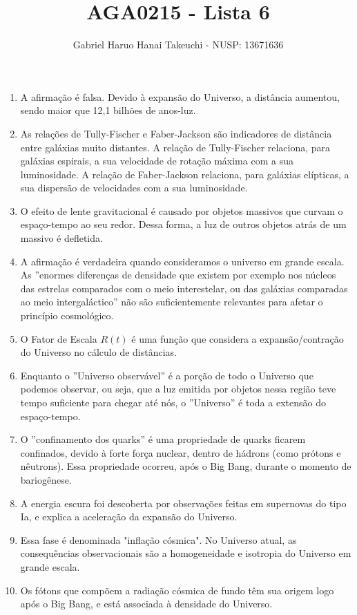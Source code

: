 \documentclass{article}
\author{Gabriel Haruo Hanai Takeuchi - NUSP: 13671636}
\title{AGA0215 - Lista 6}
\date{}
\begin{document}
\maketitle

\begin{enumerate}
  \item A afirmação é falsa. Devido à expansão do Universo, a distância aumentou, sendo maior que 12,1 bilhões de anos-luz.
  \item As relações de Tully-Fischer e Faber-Jackson são indicadores de distância entre galáxias muito distantes. A relação de Tully-Fischer relaciona, para galáxias espirais, a sua velocidade de rotação máxima com a sua luminosidade. A relação de Faber-Jackson relaciona, para galáxias elípticas, a sua dispersão de velocidades com a sua luminosidade.
  \item O efeito de lente gravitacional é causado por objetos massivos que curvam o espaço-tempo ao seu redor. Dessa forma, a luz de outros objetos atrás de um massivo é defletida.
  \item A afirmação é verdadeira quando consideramos o universo em grande escala. As ''enormes diferenças de densidade que existem por exemplo nos núcleos das estrelas comparados com o meio interestelar, ou das galáxias comparadas ao meio intergaláctico'' não são suficientemente relevantes para afetar o princípio cosmológico.
  \item O Fator de Escala $R(t)$ é uma função que considera a expansão/contração do Universo no cálculo de distâncias.
  \item Enquanto o ''Universo observável'' é a porção de todo o Universo que podemos observar, ou seja, que a luz emitida por objetos nessa região teve tempo suficiente para chegar até nós, o ''Universo'' é toda a extensão do espaço-tempo.
  \item O ''confinamento dos quarks'' é uma propriedade de quarks ficarem confinados, devido à forte força nuclear, dentro de hádrons (como prótons e nêutrons). Essa propriedade ocorreu, após o Big Bang, durante o momento de bariogênese.
  \item A energia escura foi descoberta por observações feitas em supernovas do tipo Ia, e explica a aceleração da expansão do Universo.
  \item Essa fase é denominada "inflação cósmica". No Universo atual, as consequências observacionais são a homogeneidade e isotropia do Universo em grande escala.
  \item Os fótons que compõem a radiação cósmica de fundo têm sua origem logo após o Big Bang, e está associada à densidade do Universo.
\end{enumerate}
\end{document}
